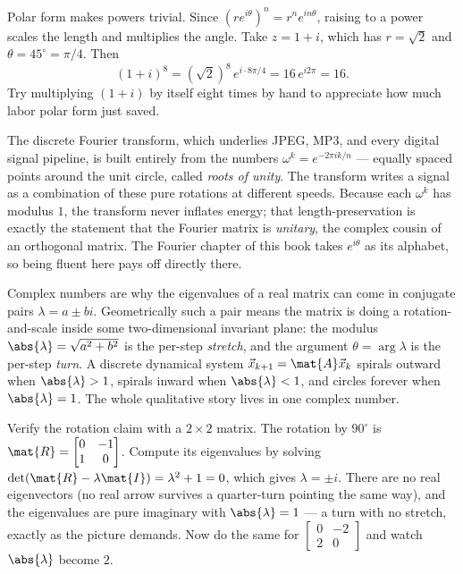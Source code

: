 \begin{example}
\label{ch39:ex-demoivre}
Polar form makes powers trivial. Since $(re^{i\theta})^n = r^n e^{in\theta}$, raising to a power
scales the length and multiplies the angle. Take $z = 1 + i$, which has $r = \sqrt2$ and $\theta =
45^\circ = \pi/4$. Then
\[
(1+i)^8 = (\sqrt2)^8\, e^{i\cdot 8\pi/4} = 16\, e^{i 2\pi} = 16.
\]
Try multiplying $(1+i)$ by itself eight times by hand to appreciate how much labor polar form just
saved.
\end{example}

\begin{applicationbox}
The discrete Fourier transform, which underlies JPEG, MP3, and every digital signal pipeline, is
built entirely from the numbers $\omega^k = e^{-2\pi i k/n}$ --- equally spaced points around the unit
circle, called \emph{roots of unity}. The transform writes a signal as a combination of these pure
rotations at different speeds. Because each $\omega^k$ has modulus $1$, the transform never inflates
energy; that length-preservation is exactly the statement that the Fourier matrix is \emph{unitary},
the complex cousin of an orthogonal matrix. The Fourier chapter of this book takes $e^{i\theta}$ as
its alphabet, so being fluent here pays off directly there.
\end{applicationbox}

\begin{connectionbox}
Complex numbers are why the eigenvalues of a real matrix can come in conjugate pairs $\lambda =
a \pm bi$. Geometrically such a pair means the matrix is doing a rotation-and-scale inside some
two-dimensional invariant plane: the modulus $\abs{\lambda} = \sqrt{a^2+b^2}$ is the per-step
\emph{stretch}, and the argument $\theta = \arg\lambda$ is the per-step \emph{turn}. A discrete
dynamical system $\vec{x}_{k+1} = \mat{A}\vec{x}_k$ spirals outward when $\abs{\lambda} > 1$, spirals
inward when $\abs{\lambda} < 1$, and circles forever when $\abs{\lambda} = 1$. The whole qualitative
story lives in one complex number.
\end{connectionbox}

\begin{labbox}
Verify the rotation claim with a $2\times 2$ matrix. The rotation by $90^\circ$ is
$\mat{R} = \begin{bmatrix} 0 & -1\\ 1 & 0\end{bmatrix}$. Compute its eigenvalues by solving
$\det(\mat{R} - \lambda \mat{I}) = \lambda^2 + 1 = 0$, which gives $\lambda = \pm i$. There are no
real eigenvectors (no real arrow survives a quarter-turn pointing the same way), and the eigenvalues
are pure imaginary with $\abs{\lambda} = 1$ --- a turn with no stretch, exactly as the picture
demands. Now do the same for $\begin{bmatrix} 0 & -2\\ 2 & 0\end{bmatrix}$ and watch $\abs{\lambda}$
become $2$.
\end{labbox}


